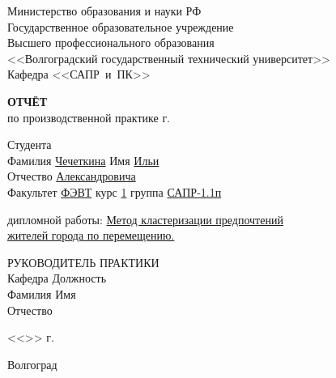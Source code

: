\begin{titlepage}
    \begin{center}
        Министерство образования и науки РФ \\
        Государственное образовательное учреждение\\
        Высшего профессионального образования\\
        <<Волгоградский государственный технический университет>>\\
        Кафедра <<САПР~и~ПК>>
    \end{center}
    \vspace{2.0cm}
    \begin{center}
        \large \textbf{ОТЧЁТ} \\
        по производственной практике \the\year г.
    \end{center}
    \begin{flushleft}
        Студента\\
        Фамилия \underline{Чечеткина\hspace{2.6cm}}
        Имя \underline{Ильи\hspace{3.5cm}}\\
        Отчество \underline{Александровича\hspace{1.33cm}}\\
        Факультет \underline{ФЭВТ\hspace{3.23cm}} курс \underline{1\hspace{.8cm}}
        группа \underline{САПР-1.1п\hspace{2.2cm}}\\
    \end{flushleft}
    \vspace{1.0cm}
     дипломной работы: \underline{Метод кластеризации предпочтений\hspace{2cm}}\\
    \underline{жителей города по перемещению.\hspace{8.35cm}}
    \vspace{1.0cm}
    \begin{flushleft}
        РУКОВОДИТЕЛЬ ПРАКТИКИ\\
        Кафедра \underline{\hspace{5cm}} Должность \underline{\hspace{5cm}} \\
        Фамилия \underline{\hspace{5cm}} Имя \underline{\hspace{6.5cm}}\\
        Отчество \underline{\hspace{5cm}}
    \end{flushleft}
    \vspace{1.5cm}
    \begin{flushright}
        <<\underline{\hspace{1.0cm}}>>\underline{\hspace{4.0cm}} \the\year г.
    \end{flushright}
    \vspace{\fill}
    \begin{center}
        Волгоград \the\year
    \end{center}
\end{titlepage}
